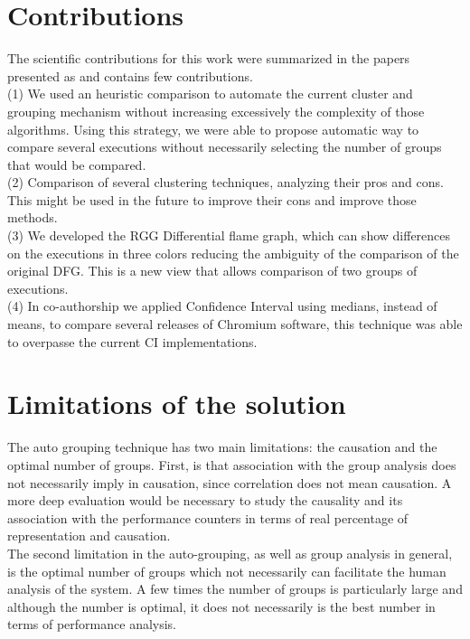 \section{Contributions}
The scientific contributions for this work were summarized in the papers presented as and contains few contributions. \\
(1) We used an heuristic comparison to automate the current cluster and grouping mechanism without increasing excessively the complexity of those algorithms. Using this strategy, we were able to propose automatic way to compare several executions without necessarily selecting the number of groups that would be compared.\\
(2) Comparison of several clustering techniques, analyzing their pros and cons. This might be used in the future to improve their cons and improve those methods.\\ 
(3) We developed the RGG Differential flame graph, which can show differences on the executions in three colors reducing the ambiguity of the comparison of the original DFG. This is a new view that allows comparison of two groups of executions. \\
(4) In co-authorship we applied Confidence Interval using medians, instead of means, to compare several releases of Chromium software, this technique was able to overpasse the current CI implementations.

\section{Limitations of the solution}
The auto grouping technique has two main limitations: the causation and the optimal number of groups.
First, is that association with the group analysis does not necessarily imply in causation, since correlation does not mean causation. A more deep evaluation would be necessary to study the causality and its association with the performance counters in terms of real percentage of representation and causation.\\
The second limitation in the auto-grouping, as well as group analysis in general, is the optimal number of groups which not necessarily can facilitate the human analysis of the system. A few times the number of groups is particularly large and although the number is optimal, it does not necessarily is the best number in terms of performance analysis.

